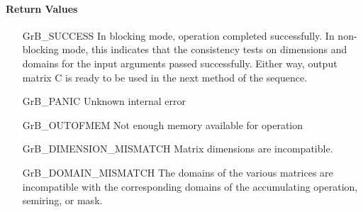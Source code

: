 \paragraph{Return Values}

\begin{itemize}[leftmargin=2.1in]

	\item[{\sf GrB\_SUCCESS}]	      In blocking mode, operation
	completed successfully. In non-blocking mode, this indicates
	that the consistency tests on dimensions and domains for the
	input arguments passed successfully. Either way, output matrix
	{\sf C} is ready to be used in the next method of the sequence.

	\item[{\sf GrB\_PANIC}]		      Unknown internal error

	\item[{\sf GrB\_OUTOFMEM}]	      Not enough memory available
	for operation

	\item[{\sf GrB\_DIMENSION\_MISMATCH}] Matrix dimensions are
	incompatible.

	\item[{\sf GrB\_DOMAIN\_MISMATCH}]    The domains of the various
	matrices are incompatible with the corresponding domains of the
	accumulating operation, semiring, or mask.

\end{itemize}

